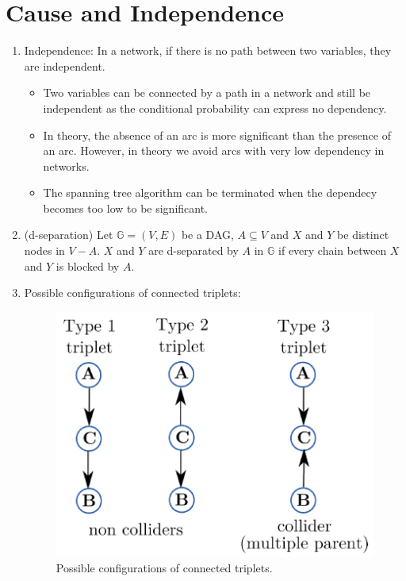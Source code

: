 \documentclass[12pt,twoside]{article}
\begin{document}
\newpage 




\section{Cause and Independence}



\begin{enumerate}
\item Independence: In a network, if there is no path between two variables, they are independent. 
\begin{itemize}
\item Two variables can be connected by a path in a network and still be independent as the conditional probability can express no dependency.
\item In theory, the absence of an arc is more significant than the presence of an arc. However, in theory we avoid arcs with very low dependency in networks.
\item The spanning tree algorithm can be terminated when the dependecy becomes too low to be significant.
\end{itemize}

\item (d-separation) Let $\mathbb{G}=(V,E)$ be a DAG, $A\subseteq V$ and $X$ and $Y$ be distinct nodes in $V-A$. $X$ and $Y$ are d-separated by $A$ in $\mathbb{G}$ if every chain between $X$ and $Y$ is blocked by $A$.

\item Possible configurations of connected triplets:
\begin{figure}[H]
\begin{center}
\includegraphics[width = 0.4\hsize]{./figures/TripletConfig.png} %
\caption{Possible configurations of connected triplets.} %
\label{fig:NaiveBayes} %
\end{center}
\end{figure}


\end{enumerate}
\end{document}
